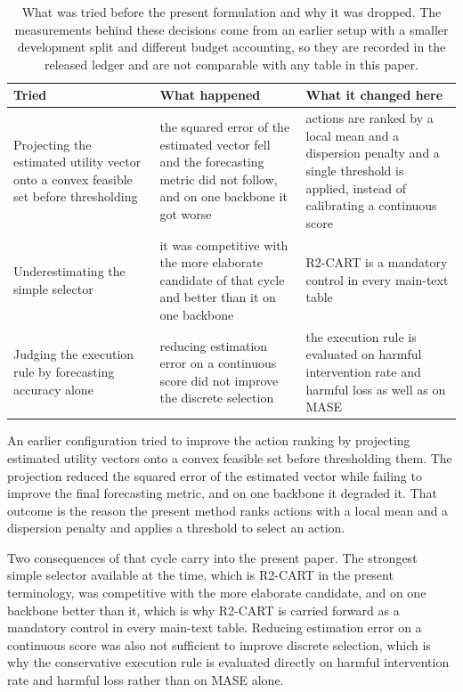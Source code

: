 \documentclass{article}
\begin{document}
\begin{table}[tp]
  \caption{What was tried before the present formulation and why it was dropped. The
  measurements behind these decisions come from an earlier setup with a smaller development
  split and different budget accounting, so they are recorded in the released ledger and are
  not comparable with any table in this paper.}
  \label{tab:app-development}
  \centering
  \small
  \setlength{\tabcolsep}{4pt}
\begin{tabular}{@{}p{} p{} p{}@{}}
    \toprule
    Tried & What happened & What it changed here \\
    \midrule
    Projecting the estimated utility vector onto a convex feasible set before thresholding & the squared error of the estimated vector fell and the forecasting metric did not follow, and on one backbone it got worse & actions are ranked by a local mean and a dispersion penalty and a single threshold is applied, instead of calibrating a continuous score \\
    Underestimating the simple selector & it was competitive with the more elaborate candidate of that cycle and better than it on one backbone & R2-CART is a mandatory control in every main-text table \\
    Judging the execution rule by forecasting accuracy alone & reducing estimation error on a continuous score did not improve the discrete selection & the execution rule is evaluated on harmful intervention rate and harmful loss as well as on MASE \\
    \bottomrule
  \end{tabular}
\end{table}

An earlier configuration tried to improve the action ranking by projecting estimated utility
vectors onto a convex feasible set before thresholding them. The projection reduced the squared
error of the estimated vector while failing to improve the final forecasting metric, and on one
backbone it degraded it. That outcome is the reason the present method ranks actions with a
local mean and a dispersion penalty and applies a threshold to select an action.

Two consequences of that cycle carry into the present paper. The strongest simple selector
available at the time, which is R2-CART in the present terminology, was competitive with the
more elaborate candidate, and on one backbone better than it, which is why R2-CART is carried
forward as a mandatory control in every main-text table. Reducing estimation error on a
continuous score was also not sufficient to improve discrete selection, which is why the
conservative execution rule is evaluated directly on harmful intervention rate and harmful loss rather
than on MASE alone.
\end{document}
